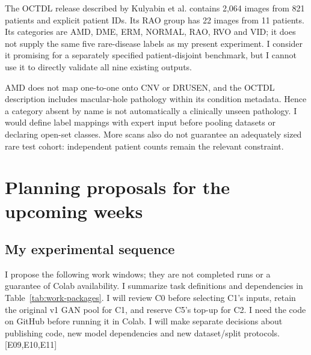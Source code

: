 \documentclass[11pt,a4paper]{article}
\newcommand{\ev}[1]{\textcolor{Link}{\textsf{[#1]}}}
\begin{document}
The OCTDL release described by Kulyabin et al. contains 2,064 images from
821 patients and explicit patient IDs. Its RAO group has 22 images from
11 patients. Its categories are AMD, DME, ERM, NORMAL, RAO, RVO and VID;
it does not supply the same five rare-disease labels as my present experiment.
I consider it promising for a separately specified patient-disjoint benchmark,
but I cannot use it to directly validate all nine existing outputs. \cite{octdl}

AMD does not map one-to-one onto CNV or DRUSEN, and the OCTDL description
includes macular-hole pathology within its condition metadata. Hence a
category absent by name is not automatically a clinically unseen pathology.
I would define label mappings with expert input before pooling datasets or
declaring open-set classes. More scans also do not guarantee an adequately sized rare
test cohort: independent patient counts remain the relevant constraint.
\cite{octdl}

\section{Planning proposals for the upcoming weeks}

\subsection{My experimental sequence}

I propose the following work windows; they are not completed runs or a guarantee
of Colab availability. I summarize task definitions and dependencies in
Table~\ref{tab:work-packages}. I will review C0 before selecting C1's inputs,
retain the original v1 GAN pool for C1, and reserve C5's top-up for C2.
I need the code on GitHub before running it in Colab. I will make separate
decisions about publishing code, new model dependencies and new dataset/split
protocols. \ev{E09,E10,E11}
\end{document}
